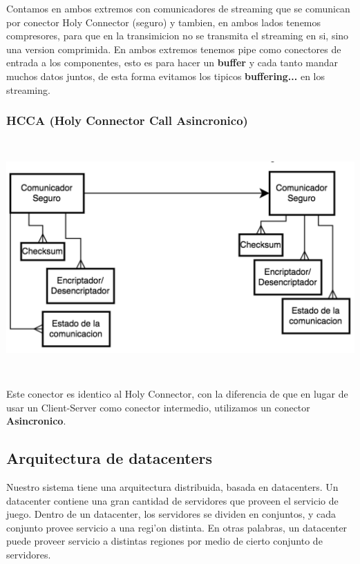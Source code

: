 Contamos en ambos extremos con comunicadores de streaming que se comunican por conector Holy Connector (seguro) y tambien, en ambos lados tenemos compresores, para que en la transimicion no se transmita el streaming en si, sino una version comprimida.
En ambos extremos tenemos pipe como conectores de entrada a los componentes, esto es para hacer un \textbf{buffer} y cada tanto mandar muchos datos juntos, de esta forma evitamos los tipicos \textbf{buffering...} en los streaming.


\subsubsection{HCCA (Holy Connector Call Asincronico)}

\includegraphics[height=9cm]{diagramas/HCCA} 

Este conector es identico al Holy Connector, con la diferencia de que en lugar de usar un Client-Server como conector intermedio, utilizamos un conector \textbf{Asincronico}.

\subsection{Arquitectura de datacenters}

Nuestro sistema tiene una arquitectura distribuida, basada en datacenters. Un datacenter contiene una gran cantidad de servidores que proveen el servicio de juego. Dentro de un datacenter, los servidores se dividen en conjuntos, y cada conjunto provee servicio a una regi'on distinta. En otras palabras, un datacenter puede proveer servicio a distintas regiones por medio de cierto conjunto de servidores.

